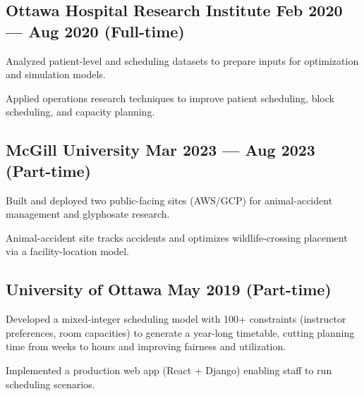 \subsection{{Ottawa Hospital Research Institute \hfill Feb 2020 --- Aug 2020 (Full-time)}}
\vspace{0.1em}
\begin{zitemize}
    \setlength\itemsep{0.1em}
    \item Analyzed patient-level and scheduling datasets to prepare inputs for optimization and simulation models.
    \item Applied operations research techniques to improve patient scheduling, block scheduling, and capacity planning.
\end{zitemize}
\vspace{0.5em}

\subsection{{McGill University \hfill Mar 2023 --- Aug 2023 (Part-time)}}
\vspace{0.1em}
\begin{zitemize}
    \setlength\itemsep{0.1em}
    \item Built and deployed two public-facing sites (AWS/GCP) for animal-accident management and glyphosate research.
    \item Animal-accident site tracks accidents and optimizes wildlife-crossing placement via a facility-location model.
\end{zitemize}
\vspace{0.5em}

\subsection{{University of Ottawa \hfill May 2019 (Part-time)}}
\vspace{0.1em}
\begin{zitemize}
    \setlength\itemsep{0.1em}
    \item Developed a mixed-integer scheduling model with 100+ constraints (instructor preferences, room capacities) to generate a year-long timetable, cutting planning time from weeks to hours and improving fairness and utilization.
    \item Implemented a production web app (React + Django) enabling staff to run scheduling scenarios.
\end{zitemize}
